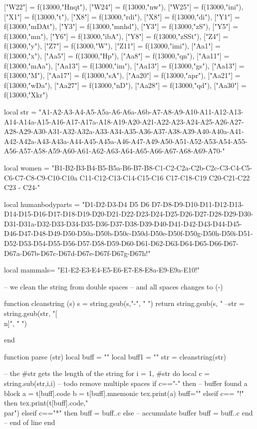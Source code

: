 \documentclass{article}
\begin{document}
\begin{luacode*}
{	["W22"] = f(13000,"Hnqt"),
	["W24"] = f(13000,"nw"),
	["W25"] = f(13000,"ini"),
	["X1"] = f(13000,"t"),
	["X8"] = f(13000,"rdi"),
	["X8"] = f(13000,"di"),
	["Y1"] = f(13000,"mDAt"),
	["Y3"] = f(13000,"mnhd"),
	["Y3"] = f(13000,"zS"),
	["Y5"] = f(13000,"mn"),
	["Y6"] = f(13000,"ibA"),
	["Y8"] = f(13000,"zSSt"),
	["Z4"] = f(13000,"y"),
	["Z7"] = f(13000,"W"),
	["Z11"] = f(13000,"imi"),
	["Aa1"] = f(13000,"x"),
	["Aa5"] = f(13000,"Hp"),
	["Aa8"] = f(13000,"qn"),
	["Aa11"] = f(13000,"mAa"),
	["Aa13"] = f(13000,"im"),
	["Aa13"] = f(13000,"gs"),
	["Aa13"] = f(13000,"M"),
	["Aa17"] = f(13000,"sA"),
	["Aa20"] = f(13000,"apr"),
	["Aa21"] = f(13000,"wDa"),
	["Aa27"] = f(13000,"nD"),
	["Aa28"] = f(13000,"qd"),
	["Aa30"] = f(13000,"Xkr")
}

local str = "A1-A2-A3-A4-A5-A5a-A6-A6a-A6b-A7-A8-A9-A10-A11-A12-A13-A14-A14a-A15-A16-A17-A17a-A18-A19-A20-A21-A22-A23-A24-A25-A26-A27-A28-A29-A30-A31-A32-A32a-A33-A34-A35-A36-A37-A38-A39-A40-A40a-A41-A42-A42a-A43-A43a-A44-A45-A45a-A46-A47-A49-A50-A51-A52-A53-A54-A55-A56-A57-A58-A59-A60-A61-A62-A63-A64-A65-A66-A67-A68-A69-A70-"

local women = "B1-B2-B3-B4-B5-B5a-B6-B7-B8-C1-C2-C2a-C2b-C2c-C3-C4-C5-C6-C7-C8-C9-C10-C10a C11-C12-C13-C14-C15-C16 C17-C18-C19 C20-C21-C22  C23 - C24-"

local humanbodyparts = "D1-D2-D3-D4 D5 D6 D7-D8-D9-D10-D11-D12-D13-D14-D15-D16-D17-D18-D19-D20-D21-D22-D23-D24-D25-D26-D27-D28-D29-D30-D31-D31a-D32-D33-D34-D35-D36-D37-D38-D39-D40-D41-D42-D43-D44-D45-D46-D47-D48-D49-D50-D50a-D50b-D50c-D50d-D50e-D50f-D50g-D50h-D50i-D51-D52-D53-D54-D55-D56-D57-D58-D59-D60-D61-D62-D63-D64-D65-D66-D67-D67a-D67b-D67c-D67d-D67e-D67f-D67g-D67h!"

local mammals= "E1-E2-E3-E4-E5-E6-E7-E8-E8a-E9-E9a-E10!"


-- we clean the string from double spaces
-- and all spaces changes to (-)


function cleanstring (s)
  s = string.gsub(s,"-", " ")
  return string.gsub(s, "%
--str = string.gsub(str, "[\\n]", " ")
  
end





function parse (str) 
  local buff = ""
  local buff1 = "" 
  str = cleanstring(str)

-- the #str gets the length of the string
  for i = 1, #str do
    local c = string.sub(str,i,i) 
    -- todo remove multiple spaces
    if c=="-" then 
       -- buffer found a block
       a = t[buff].code
       b = t[buff].mnemonic
       tex.print(a) 
       buff=""
     elseif c== "!" then
       tex.print(t[buff].code,"\\par")
     elseif c=="*" then
       buff = buff..c
     else 
       -- accumulate buffer
       buff = buff..c
  end
    -- end of line
  end


\end{luacode*}
\end{document}
